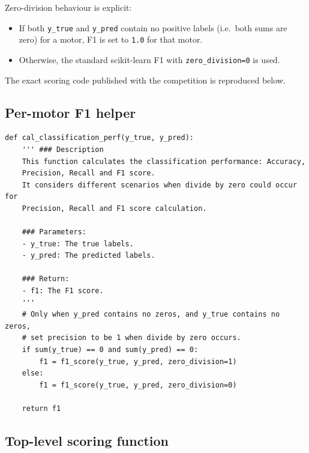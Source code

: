 \documentclass[11pt,a4paper]{article}
\begin{document}
Zero-division behaviour is explicit:
\begin{itemize}[leftmargin=1.4em]
  \item If both \texttt{y\_true} and \texttt{y\_pred} contain no positive
        labels (i.e.\ both sums are zero) for a motor, F1 is set to
        \texttt{1.0} for that motor.
  \item Otherwise, the standard scikit-learn F1 with \texttt{zero\_division=0}
        is used.
\end{itemize}

The exact scoring code published with the competition is reproduced below.

\subsection*{Per-motor F1 helper}

\begin{lstlisting}[style=py]
def cal_classification_perf(y_true, y_pred):
    ''' ### Description
    This function calculates the classification performance: Accuracy,
    Precision, Recall and F1 score.
    It considers different scenarios when divide by zero could occur for
    Precision, Recall and F1 score calculation.

    ### Parameters:
    - y_true: The true labels.
    - y_pred: The predicted labels.

    ### Return:
    - f1: The F1 score.
    '''
    # Only when y_pred contains no zeros, and y_true contains no zeros,
    # set precision to be 1 when divide by zero occurs.
    if sum(y_true) == 0 and sum(y_pred) == 0:
        f1 = f1_score(y_true, y_pred, zero_division=1)
    else:
        f1 = f1_score(y_true, y_pred, zero_division=0)

    return f1
\end{lstlisting}

\subsection*{Top-level scoring function}
\end{document}
